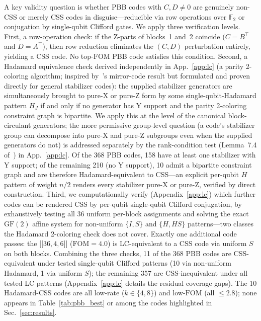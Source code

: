\documentclass[aps,prxquantum,twocolumn,superscriptaddress,nofootinbib]{revtex4-2}
\newcommand{\FF}{\ensuremath{\mathbb{F}}}
\newcommand{\dblbrk}[1]{\ensuremath{\lbrack\!\lbrack #1 \rbrack\!\rbrack}}
\newcommand{\code}[1]{\dblbrk{#1}}
\newcommand{\FOM}{\ensuremath{\mathrm{FOM}}}
\begin{document}
A key validity question is whether PBB codes with $C, D \neq 0$ are genuinely non-CSS or merely CSS codes in disguise---reducible via row operations over $\FF_2$ or conjugation by single-qubit Clifford gates.
We apply three verification levels.
First, a row-operation check: if the Z-parts of blocks~1 and~2 coincide ($C = B^\top$ and $D = A^\top$), then row reduction eliminates the $(C, D)$ perturbation entirely, yielding a CSS code.
No top-$\FOM$ PBB code satisfies this condition.
Second, a Hadamard equivalence check derived independently in App.~\ref{app:lc} (a parity 2-coloring algorithm; inspired by~\cite{khesin2026mirror}'s mirror-code result but formulated and proven directly for general stabilizer codes): the supplied stabilizer generators are simultaneously brought to pure-X or pure-Z form by some single-qubit-Hadamard pattern $H_J$ if and only if no generator has Y support and the parity 2-coloring constraint graph is bipartite. We apply this at the level of the canonical block-circulant generators; the more permissive group-level question (a code's stabilizer group can decompose into pure-X and pure-Z subgroups even when the supplied generators do not) is addressed separately by the rank-condition test (Lemma~7.4 of~\cite{cross2025small}) in App.~\ref{app:lc}.
Of the 368 PBB codes, 158 have at least one stabilizer with Y support; of the remaining 210 (no Y support), 10 admit a bipartite constraint graph and are therefore Hadamard-equivalent to CSS---an explicit per-qubit $H$ pattern of weight $n/2$ renders every stabilizer pure-X or pure-Z, verified by direct construction.
Third, we computationally verify (Appendix~\ref{app:lc}) which further codes can be rendered CSS by per-qubit single-qubit Clifford conjugation, by exhaustively testing all 36 uniform per-block assignments and solving the exact $\mathrm{GF}(2)$ affine system for non-uniform $\{I,S\}$ and $\{H,HS\}$ patterns---two classes the Hadamard 2-coloring check does not cover.
Exactly one additional code passes: the $\code{36,4,6}$ ($\FOM = 4.0$) is LC-equivalent to a CSS code via uniform $S$ on both blocks.
Combining the three checks, 11 of the 368 PBB codes are CSS-equivalent under tested single-qubit Clifford patterns (10 via non-uniform Hadamard, 1 via uniform $S$); the remaining 357 are CSS-inequivalent under all tested LC patterns (Appendix~\ref{app:lc} details the residual coverage gaps).
The 10 Hadamard-CSS codes are all low-rate ($k \in \{4, 8\}$) and low-$\FOM$ (all $\leq 2.8$); none appears in Table~\ref{tab:pbb_best} or among the codes highlighted in Sec.~\ref{sec:results}.
\end{document}

